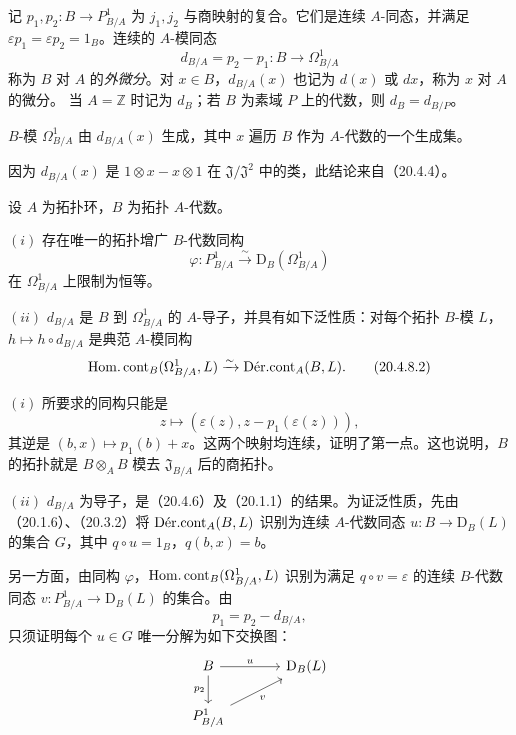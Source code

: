 记 $p_1,p_2:B\to P^1_{B/A}$ 为 $j_1,j_2$ 与商映射的复合。它们是连续 $A$-同态，并满足 $\varepsilon p_1=\varepsilon p_2=1_B$。连续的 $A$-模同态
\begin{equation}
 d_{B/A}=p_2-p_1:B\longrightarrow\Omega^1_{B/A}
 \tag{20.4.6.1}
\end{equation}
称为 $B$ 对 $A$ 的\emph{外微分}。对 $x\in B$，$d_{B/A}(x)$ 也记为 $d(x)$ 或 $dx$，称为 $x$ 对 $A$ 的微分。
当 $A=\mathbb Z$ 时记为 $d_B$；若 $B$ 为素域 $P$ 上的代数，则 $d_B=d_{B/P}$。

$B$-模 $\Omega^1_{B/A}$ 由 $d_{B/A}(x)$ 生成，其中 $x$ 遍历 $B$ 作为 $A$-代数的一个生成集。

因为 $d_{B/A}(x)$ 是 $1\otimes x-x\otimes1$ 在 $\mathfrak J/\mathfrak J^2$ 中的类，此结论来自（20.4.4）。

设 $A$ 为拓扑环，$B$ 为拓扑 $A$-代数。

$(i)$ 存在唯一的拓扑增广 $B$-代数同构
\begin{equation}
 \varphi:P^1_{B/A}\xrightarrow{\sim}\mathrm D_B(\Omega^1_{B/A})
 \tag{20.4.8.1}
\end{equation}
在 $\Omega^1_{B/A}$ 上限制为恒等。

$(ii)$ $d_{B/A}$ 是 $B$ 到 $\Omega^1_{B/A}$ 的 $A$-导子，并具有如下泛性质：对每个拓扑 $B$-模 $L$，$h\mapsto h\circ d_{B/A}$ 是典范 $A$-模同构
\begin{equation}
 \HomCont_B(\Omega^1_{B/A},L)
 \xrightarrow{\sim}\DerCont_A(B,L).
 \tag{20.4.8.2}
\end{equation}

$(i)$ 所要求的同构只能是
\[
 z\longmapsto(\varepsilon(z),z-p_1(\varepsilon(z))),
\]
其逆是 $(b,x)\mapsto p_1(b)+x$。这两个映射均连续，证明了第一点。这也说明，$B$ 的拓扑就是 $B\otimes_A B$ 模去 $\mathfrak J_{B/A}$ 后的商拓扑。

$(ii)$ $d_{B/A}$ 为导子，是（20.4.6）及（20.1.1）的结果。为证泛性质，先由（20.1.6）、（20.3.2）将 $\DerCont_A(B,L)$ 识别为连续 $A$-代数同态 $u:B\to\mathrm D_B(L)$ 的集合 $G$，其中 $q\circ u=1_B$，$q(b,x)=b$。

另一方面，由同构 $\varphi$，$\HomCont_B(\Omega^1_{B/A},L)$ 识别为满足 $q\circ v=\varepsilon$ 的连续 $B$-代数同态 $v:P^1_{B/A}\to\mathrm D_B(L)$ 的集合。由
\[
 p_1=p_2-d_{B/A},
\]
只须证明每个 $u\in G$ 唯一分解为如下交换图：
\[
\begin{tikzcd}[column sep=large]
 B\arrow[r,"u"]\arrow[d,"p_2"']&\mathrm D_B(L)\\
 P^1_{B/A}\arrow[ur,"v"']&
\end{tikzcd}
\]

